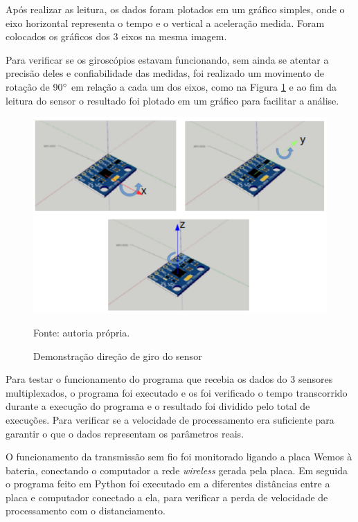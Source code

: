 	Após realizar as leitura, os dados foram plotados em um gráfico simples, onde o eixo horizontal representa o tempo e o vertical a aceleração medida. Foram colocados os gráficos dos 3 eixos na mesma imagem. 
	
	Para verificar se os giroscópios estavam funcionando, sem ainda se atentar a precisão deles e confiabilidade das medidas, foi realizado um movimento de rotação de 90$ \degree $ em relação a cada um dos eixos, como na Figura \ref{validacao_giro}  e ao fim da leitura do sensor o resultado foi plotado em um gráfico para facilitar a análise.
	
	\begin{figure}[h]
		\centering
		\includegraphics[keepaspectratio=true,scale=0.55]{figuras/validacao_giro.png}
		\caption{Demonstração direção de giro do sensor}
		Fonte: autoria própria. 
		\label{validacao_giro}	
	\end{figure}
	
	Para testar o funcionamento do programa que recebia os dados do 3 sensores multiplexados, o programa foi executado e os foi verificado o tempo transcorrido durante a execução do programa e o resultado foi dividido pelo total de execuções. Para verificar se a velocidade de processamento era suficiente para garantir o que o dados representam os parâmetros reais.
	
	O funcionamento da transmissão sem fio foi monitorado ligando a placa Wemos à bateria, conectando o computador a rede \textit{wireless} gerada pela placa. Em seguida o programa feito em Python foi executado em a diferentes distâncias entre a placa e computador conectado a ela, para verificar a perda de velocidade de processamento com o distanciamento.
	
